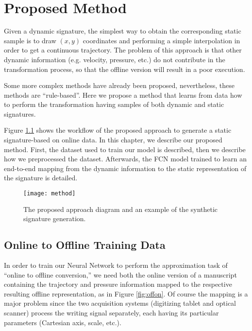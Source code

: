 
\chapter{Proposed Method}\label{ch:method}


Given a dynamic signature, the simplest way to obtain the corresponding static sample is to draw $(x, y)$ coordinates and performing a simple interpolation in order to get a continuous trajectory. The problem of this approach is that other dynamic information (e.g. velocity, pressure, etc.) do not contribute in the transformation process, so that the offline version will result in a poor execution.

Some more complex methods have already been proposed, nevertheless, these methods are “rule-based”. Here we propose a method that learns from data how to perform the transformation having samples of both dynamic and static signatures. 

Figure \ref{fig_method}  shows the workflow of the proposed approach to generate a static signature-based on online data. In this chapter, we describe our proposed method. First, the dataset used to train our model is described, then we describe how we preprocessed the dataset. Afterwards, the FCN model trained to learn an end-to-end mapping from the dynamic information to the static representation of the signature is detailed.

\begin{figure}[!htb]
	\centering
	\texttt{[image: method]}
	\caption{The proposed approach diagram and an example of the synthetic signature generation.}
	\label{fig_method}
\end{figure}



\section{Online to Offline Training Data}
In order to train our Neural Network to perform the approximation task of ``online to offline conversion,'' we need both the online version of a manuscript containing the trajectory and pressure information mapped to the respective resulting offline representation, as in Figure \ref{fig:offon}. Of course the mapping is a major problem since the two acquisition systems (digitizing tablet and optical scanner) process the writing signal separately, each having its particular parameters (Cartesian axis, scale, etc.). 

